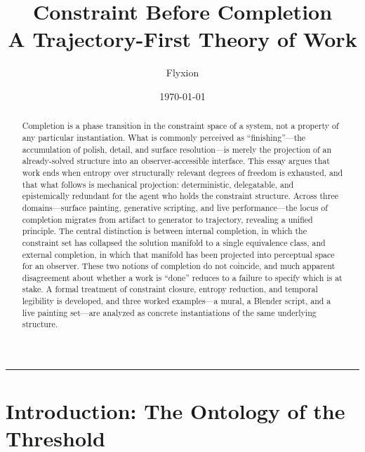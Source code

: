 \documentclass[11pt, twoside]{article}
\title{%
  \vspace{-0.5in}
  {\Large Constraint Before Completion}\\[0.4em]
  {\normalsize A Trajectory-First Theory of Work}
}
\author{Flyxion}
\date{\today}
\theoremstyle{plain}
\theoremstyle{definition}
\theoremstyle{remark}
\begin{document}

\maketitle
\thispagestyle{empty}

\vspace{1em}

\begin{abstract}
\noindent
Completion is a phase transition in the constraint space of a system, not a property of any particular instantiation. What is commonly perceived as ``finishing''---the accumulation of polish, detail, and surface resolution---is merely the projection of an already-solved structure into an observer-accessible interface. This essay argues that work ends when entropy over structurally relevant degrees of freedom is exhausted, and that what follows is mechanical projection: deterministic, delegatable, and epistemically redundant for the agent who holds the constraint structure. Across three domains---surface painting, generative scripting, and live performance---the locus of completion migrates from artifact to generator to trajectory, revealing a unified principle. The central distinction is between internal completion, in which the constraint set has collapsed the solution manifold to a single equivalence class, and external completion, in which that manifold has been projected into perceptual space for an observer. These two notions of completion do not coincide, and much apparent disagreement about whether a work is ``done'' reduces to a failure to specify which is at stake. A formal treatment of constraint closure, entropy reduction, and temporal legibility is developed, and three worked examples---a mural, a Blender script, and a live painting set---are analyzed as concrete instantiations of the same underlying structure.
\end{abstract}

\vspace{1em}
\noindent\rule{\textwidth}{0.4pt}
\vspace{1em}

\tableofcontents
\newpage

\section{Introduction: The Ontology of the Threshold}
\end{document}
